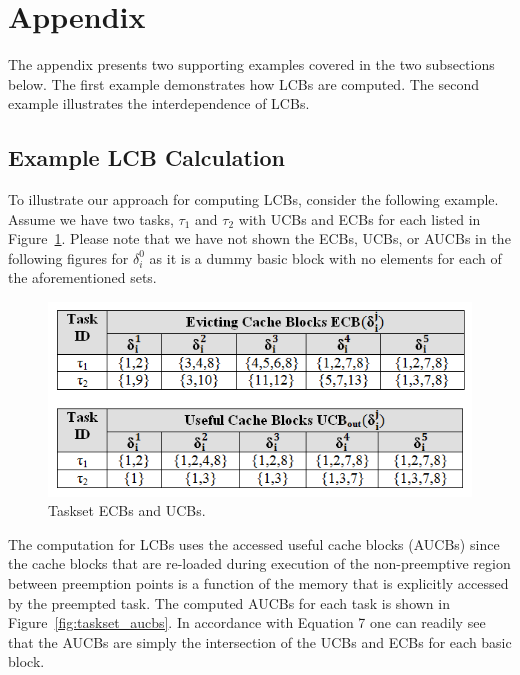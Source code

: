 %
\clearpage
%
\section{Appendix}\label{sec:appendix}
The appendix presents two supporting examples covered in the two subsections below.  The first example demonstrates how LCBs are computed.  The second example illustrates the interdependence of LCBs.

\subsection {Example LCB Calculation}\label{sec:example_lcb_calculation}
To illustrate our approach for computing LCBs, consider the following example.  Assume we have two tasks, \begin{math}\tau_{1}\end{math} and \begin{math}\tau_{2}\end{math} with UCBs and ECBs for each listed in Figure~\ref{fig:taskset_ecbs_ucbs}.  Please note that we have not shown the ECBs, UCBs, or AUCBs in the following figures for $\delta_i^0$ as it is a dummy basic block with no elements for each of the aforementioned sets.
\vspace{-5pt}
\begin{figure}[h!]
\begin{center}
\includegraphics[width=\linewidth]{taskset_ecbs_ucbs.png}
\caption{Taskset ECBs and UCBs.}
\label{fig:taskset_ecbs_ucbs}
\end{center}
\end{figure}
\vspace{-10pt}
\newline
\noindent
The computation for LCBs uses the accessed useful cache blocks (AUCBs) since the cache blocks that are re-loaded during execution of the non-preemptive region between preemption points is a function of the memory that is explicitly accessed by the preempted task.  The computed AUCBs for each task is shown in Figure~\ref{fig:taskset_aucbs}. In accordance with Equation 7 one can readily see that the AUCBs are simply the intersection of the UCBs and ECBs for each basic block.
